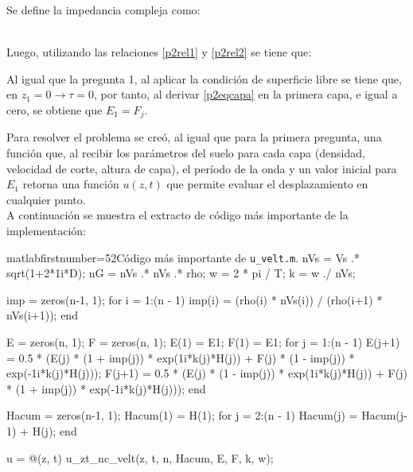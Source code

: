 Se define la impedancia compleja como:

 \\

Luego, utilizando las relaciones \eqref{p2rel1} y \eqref{p2rel2} se tiene que:


Al igual que la pregunta 1, al aplicar la condición de superficie libre se tiene que, en $z_1=0 \rightarrow \tau=0$, por tanto, al derivar \eqref{p2eqcapa} en la primera capa, e igual a cero, se obtiene que $E_1 = F_j$.


Para resolver el problema se creó, al igual que para la primera pregunta, una función que, al recibir los parámetros del suelo para cada capa (densidad, velocidad de corte, altura de capa), el período de la onda y un valor inicial para $E_1$ retorna una función $u(z,t)$ que permite evaluar el desplazamiento en cualquier punto. \\

A continuación se muestra el extracto de código más importante de la implementación:

\begin{sourcecodep}{matlab}{firstnumber=52}{Código más importante de \texttt{u\_velt.m}.}
nVs = Vs .* sqrt(1+2*1i*D); %
nG = nVs .* nVs .* rho; %
w = 2 * pi / T; %
k = w ./ nVs; %

imp = zeros(n-1, 1);
for i = 1:(n - 1)
    imp(i) = (rho(i) * nVs(i)) / (rho(i+1) * nVs(i+1));
end

E = zeros(n, 1);
F = zeros(n, 1);
E(1) = E1;
F(1) = E1; %
for j = 1:(n - 1)
    E(j+1) = 0.5 * (E(j) * (1 + imp(j)) * exp(1i*k(j)*H(j)) + F(j) * (1 - imp(j)) * exp(-1i*k(j)*H(j)));
    F(j+1) = 0.5 * (E(j) * (1 - imp(j)) * exp(1i*k(j)*H(j)) + F(j) * (1 + imp(j)) * exp(-1i*k(j)*H(j)));
end

Hacum = zeros(n-1, 1);
Hacum(1) = H(1);
for j = 2:(n - 1)
    Hacum(j) = Hacum(j-1) + H(j);
end

u = @(z, t) u_zt_nc_velt(z, t, n, Hacum, E, F, k, w);
\end{sourcecodep}

